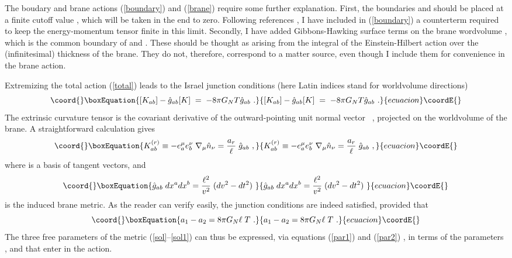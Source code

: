 \documentclass[a4paper,12pt,oneside]{article}
\begin{document}
The boudary and brane actions  (\ref{boundary})
and (\ref{brane}) require  some
further  explanation. First, the boundaries
\coordHE{} and  \coordHE{} should be placed
at a  finite cutoff value  \coordHE{}, which will  be taken in
the end to zero.
 Following references
\cite{HSken,BK,dSS}, I  have  included in (\ref{boundary})
a counterterm  required to keep  the energy-momentum tensor finite
in this limit.
Secondly, I have
added Gibbons-Hawking surface terms on the
brane wordvolume \myHighlight{$\Sigma$}\coordHE{},  which is the common boundary of
\coordHE{} and  \coordHE{}.
These should be thought as  arising
from the  integral of  the Einstein-Hilbert
action over the (infinitesimal) thickness of the brane.
They do not, therefore,  correspond to a matter source,
even though  I  include
them  for convenience in  the brane action.

Extremizing  the total  action (\ref{total})  leads to
the  Israel junction conditions \cite{Israel,MTW}
(here Latin indices stand for worldvolume directions)
\begin{equation}\coord{}\boxEquation{
[ K_{ab}] - \hat g_{ab} [ K]
\;  = \;   - 8\pi G_N  T \hat g_{ab} \  .
}{
[ K_{ab}] - \hat g_{ab} [ K]
\;  = \;   - 8\pi G_N  T \hat g_{ab} \  .
}{ecuacion}\coordE{}\end{equation}
The extrinsic curvature tensor is the covariant derivative of the
outward-pointing unit normal vector \  \coordHE{},
projected on the worldvolume of the brane. A straightforward  calculation gives
\begin{equation}\coord{}\boxEquation{
K_{ab}^{(r)} \equiv  - e_a^\mu e_b^\nu\;
\nabla_\mu  {\hat n}_{\nu} = {a_r \over  \ell}\; {\hat g}_{ab}\ ,
}{
K_{ab}^{(r)} \equiv  - e_a^\mu e_b^\nu\;
\nabla_\mu  {\hat n}_{\nu} = {a_r \over  \ell}\; {\hat g}_{ab}\ ,
}{ecuacion}\coordE{}\end{equation}
where   \coordHE{} is  a basis
of tangent vectors, and
\begin{equation}\coord{}\boxEquation{
{\hat g}_{ab}\;  dx^a dx^b   = {\ell^2\over v^2}\;(dv^2 - dt^2)\
}{
{\hat g}_{ab}\;  dx^a dx^b   = {\ell^2\over v^2}\;(dv^2 - dt^2)\
}{ecuacion}\coordE{}\end{equation}
is  the induced brane metric. As the reader can verify easily,
the junction conditions are indeed satisfied, provided that
\begin{equation}\coord{}\boxEquation{
 a_1 - a_2 = 8\pi G_N \ell\; T\ .
\label{par2}
}{
 a_1 - a_2 = 8\pi G_N \ell\; T\ .
}{ecuacion}\coordE{}\end{equation}
The three free parameters of the metric
(\ref{sol}--\ref{sol1}) can  thus be expressed,
via equations (\ref{par1}) and
(\ref{par2}) ,  in terms of
the  parameters \coordHE{},  \coordHE{} and \coordHE{} that
enter in  the  action.
\end{document}
